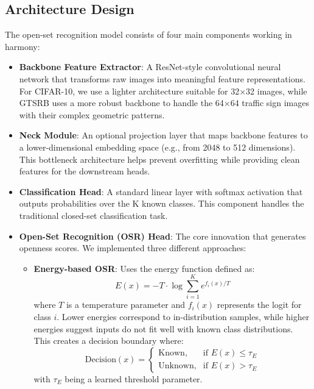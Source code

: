 \documentclass[11pt, a4paper]{article}
\begin{document}
\subsection{Architecture Design}
The open-set recognition model consists of four main components working in harmony:
\begin{itemize}
    \item \textbf{Backbone Feature Extractor}: A ResNet-style convolutional neural network that transforms raw images into meaningful feature representations. For CIFAR-10, we use a lighter architecture suitable for 32×32 images, while GTSRB uses a more robust backbone to handle the 64×64 traffic sign images with their complex geometric patterns.
    \item \textbf{Neck Module}: An optional projection layer that maps backbone features to a lower-dimensional embedding space (e.g., from 2048 to 512 dimensions). This bottleneck architecture helps prevent overfitting while providing clean features for the downstream heads.
    \item \textbf{Classification Head}: A standard linear layer with softmax activation that outputs probabilities over the K known classes. This component handles the traditional closed-set classification task.    \item \textbf{Open-Set Recognition (OSR) Head}: The core innovation that generates openness scores. We implemented three different approaches:
    \begin{itemize}
        \item \textbf{Energy-based OSR}: Uses the energy function defined as:
        \begin{equation}
            E(x) = -T \cdot \log \sum_{i=1}^{K} e^{f_i(x)/T}
        \end{equation}
        where $T$ is a temperature parameter and $f_i(x)$ represents the logit for class $i$. Lower energies correspond to in-distribution samples, while higher energies suggest inputs do not fit well with known class distributions. This creates a decision boundary where:
        \begin{equation}
            \text{Decision}(x) = 
            \begin{cases}
                \text{Known}, & \text{if } E(x) \leq \tau_E \\
                \text{Unknown}, & \text{if } E(x) > \tau_E
            \end{cases}
        \end{equation}
        with $\tau_E$ being a learned threshold parameter.
        

\end{itemize}
\end{itemize}
\end{document}
